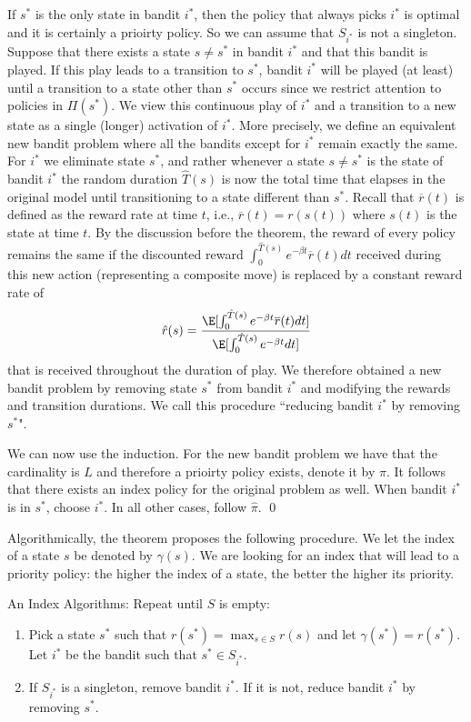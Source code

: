If $s^*$ is the only state in bandit $i^*$, then the policy that always picks $i^*$ is optimal and it is certainly a prioirty policy.
So we can assume that $S_{i^*}$ is not a singleton. Suppose that there exists a state $s\ne s^*$ in bandit $i^*$ and that
this bandit is played. If this play leads to a transition to $s^*$, bandit $i^*$ will be played (at least) until a transition to a state other than $s^*$ occurs since we restrict attention to policies in $\Pi(s^*)$. We view this continuous play of $i^*$ and a transition to a new state as a single (longer) activation of $i^*$. More precisely, we define an equivalent new bandit problem where all the bandits except for $i^*$ remain exactly the same. For $i^*$ we eliminate state $s^*$, and rather whenever a state $s\ne s^*$ is the state of bandit $i^*$ the random duration $\hat{T}(s)$ is now the total time that elapses in the original model until transitioning to a state different than $s^*$.
Recall that $\overline{r}(t)$ is defined as the reward rate at time $t$, i.e., $\overline{r}(t)=r(s(t))$ where $s(t)$ is the state at time $t$.
By the discussion before the theorem, the reward of every policy remains the same if the discounted reward
$\int_0^{\hat{T}(s)} e^{-\beta t} \overline{r}(t)dt$
received during this new action (representing a composite move) is replaced by a constant reward rate of
\begin{equation}\label{eq:2.3inTsitsiklis}
\hat{r}(s) = \frac{\E [\int_0^{\hat{T}(s)} e^{-\beta t } \overline{r}(t) dt]}{\E [\int_0^{\hat{T}(s)} e^{-\beta t }  dt]}
\end{equation}
that is received throughout the duration of play. We therefore obtained a new bandit problem by removing state $s^*$ from bandit $i^*$ and modifying the rewards and transition durations. We call this procedure ``reducing bandit $i^*$ by removing $s^*$".

We can now use the induction. For the new bandit problem we have that the cardinality is $L$ and therefore a prioirty policy exists, denote it by $\hat{\pi}$. It follows that there exists an index policy for the original problem as well. When bandit $i^*$ is in $s^*$, choose $i^*$. In all other cases, follow $\hat{\pi}$.
\qed

Algorithmically, the theorem proposes the following procedure. We let the index of a state $s$ be denoted by $\gamma(s)$. We are looking for an index that will lead to a priority policy: the higher the index of a state, the better the higher its priority.

An Index Algorithms: Repeat until $S$ is empty:
\begin{enumerate}
\item Pick a state $s^*$ such that $r(s^*) = \max_{s\in S} r(s)$ and let $\gamma(s^*) = r(s^*)$. Let $i^*$ be the bandit such that $s^* \in S_{i^*}$.
\item If $S_{i^*}$ is a singleton, remove bandit $i^*$. If it is not, reduce bandit $i^*$ by removing $s^*$.
\end{enumerate}
%

